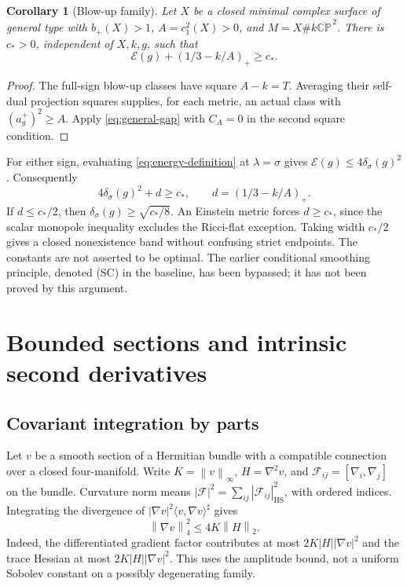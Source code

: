 \documentclass[11pt,a4paper]{article}
\newtheorem{corollary}[theorem]{Corollary}
\theoremstyle{definition}
\theoremstyle{remark}
\newcommand{\CP}{\mathbb{CP}}
\newcommand{\cE}{\mathcal E}
\newcommand{\norm}[1]{\left\|#1\right\|}
\newcommand{\HS}{\mathrm{HS}}
\numberwithin{equation}{section}
\begin{document}
\begin{corollary}[Blow-up family]\label{cor:blowups}
Let $X$ be a closed minimal complex surface of general type with
$b_+(X)>1$, $A=c_1^2(X)>0$, and
$M=X\#k\overline{\CP}^{\,2}$. There is $c_*>0$, independent of
$X,k,g$, such that
\begin{equation}\label{eq:blowup-gap}
                      \cE(g)+(1/3-k/A)_+\ge c_*.
\end{equation}
\end{corollary}
\begin{proof}
The full-sign blow-up classes have square $A-k=T$. Averaging their
self-dual projection squares supplies, for each metric, an actual class
with $(a_g^+)^2\ge A$. Apply \eqref{eq:general-gap} with $C_A=0$ in
the second square condition.
\end{proof}
For either sign, evaluating \eqref{eq:energy-definition} at
$\lambda=\sigma$ gives $\cE(g)\le4\delta_\sigma(g)^2$. Consequently
\[
 4\delta_\sigma(g)^2+d\ge c_*,\qquad d=(1/3-k/A)_+.
\]
If $d\le c_*/2$, then $\delta_\sigma(g)\ge\sqrt{c_*/8}$.
An Einstein metric forces $d\ge c_*$, since the scalar monopole
inequality excludes the Ricci-flat exception. Taking width $c_*/2$
gives a closed nonexistence band without confusing strict endpoints.
The constants are not asserted to be optimal. The earlier conditional
smoothing principle, denoted (SC) in the baseline, has been bypassed;
it has not been proved by this argument.

\section{Bounded sections and intrinsic second derivatives}\label{sec:hessian}
\subsection{Covariant integration by parts}\label{sub:hessian-identity}
Let $v$ be a smooth section of a Hermitian bundle with a compatible
connection over a closed four-manifold. Write
$K=\norm v_\infty$, $H=\nabla^2v$, and
$\mathscr F_{ij}=[\nabla_i,\nabla_j]$ on the bundle. Curvature norm means
$|\mathscr F|^2=\sum_{ij}|\mathscr F_{ij}|_{\HS}^2$, with ordered indices.
Integrating the divergence of
$|\nabla v|^2\langle v,\nabla v\rangle^\sharp$ gives
\begin{equation}\label{eq:interpolation}
                       \norm{\nabla v}_4^2\le4K\norm H_2.
\end{equation}
Indeed, the differentiated gradient factor contributes at most
$2K|H||\nabla v|^2$ and the trace Hessian at most
$2K|H||\nabla v|^2$. This uses the amplitude bound, not a uniform
Sobolev constant on a possibly degenerating family.
\end{document}
